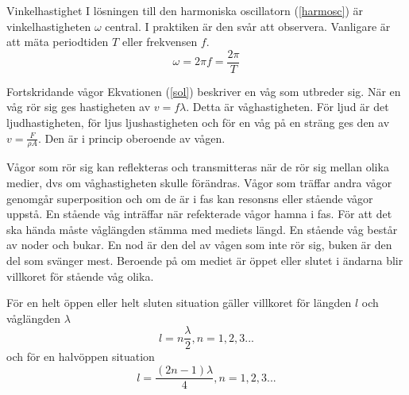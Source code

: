 \documentclass[11pt]{beamer}
\begin{document}
    \begin{frame}
        \begin{block}{Vinkelhastighet}
            I lösningen till den harmoniska oscillatorn (\ref{harmosc}) är vinkelhastigheten $\omega$ central. I praktiken
            är den svår att observera. Vanligare är att mäta periodtiden $T$ eller frekvensen $f$.
            \begin{equation}
                \omega = 2 \pi f = \frac{2 \pi}{T}
            \end{equation}
        \end{block}
    \end{frame}
    \begin{frame}
        \begin{block}{Fortskridande vågor}
            Ekvationen (\ref{sol}) beskriver en våg som utbreder sig. När en våg rör sig ges hastigheten av $v = f \lambda$.
            Detta är våghastigheten. För ljud är det ljudhastigheten, för ljus ljushastigheten och för en våg på en sträng
            ges den av $v = \frac{F}{\rho A}$. Den är i princip oberoende av vågen.

            Vågor som rör sig kan reflekteras och transmitteras när de rör sig mellan olika medier, dvs om våghastigheten skulle förändras.
            Vågor som träffar andra vågor genomgår superposition och om de är i fas kan resonsns eller stående vågor uppstå.
            En stående våg inträffar när refekterade vågor hamna i fas. För att det ska hända måste våglängden stämma med mediets längd.
            En stående våg består av noder och bukar. En nod är den del av vågen som inte rör sig, buken är den del som svänger mest.
            Beroende på om mediet är öppet eller slutet i ändarna blir villkoret för stående våg olika.
            \end{block}
        \end{frame}
    \begin{frame}
        \begin{block}{}
            För en helt öppen eller helt sluten situation gäller villkoret för längden $l$ och våglängden $\lambda$
            \begin{equation}
                l = n \frac{\lambda}{2} , n = 1,2,3...
            \end{equation}
            och för en halvöppen situation
            \begin{equation}
                l = \frac{(2n-1)\lambda}{4}  , n = 1,2,3...
            \end{equation}
        \end{block}
    \end{frame}
\end{document}
